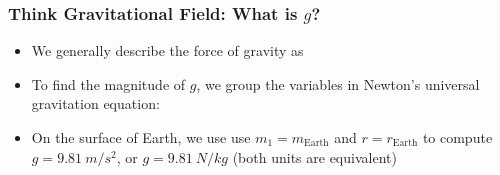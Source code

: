\documentclass[12pt,compress,aspectratio=169]{beamer}
\newcommand{\mb}[1]{\ensuremath\mathbf{#1}}
\begin{document}
\begin{frame}
  \frametitle{Think Gravitational Field: What is $g$?}
  \begin{itemize}
  \item We generally describe the force of gravity as

    \vspace{-.25in}{\Large
      \begin{displaymath}
        \mb{F}_g=m\mb{g}
      \end{displaymath}
    }
  \item To find the magnitude of $g$, we group the variables in Newton's
    universal gravitation equation:
    
  \item On the surface of Earth, we use use $m_1=m_\mathrm{Earth}$ and
    $r=r_\mathrm{Earth}$ to compute $g=\SI{9.81}{m/s^2}$, or $g=\SI{9.81}{N/kg}$
    (both units are  equivalent)
  \end{itemize}
\end{frame}
\end{document}
